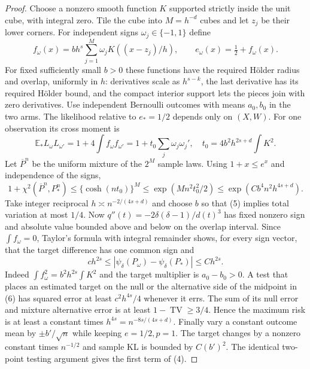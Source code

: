 \documentclass[11pt]{article}
\theoremstyle{definition}
\begin{document}
\begin{proof}
Choose a nonzero smooth function $K$ supported strictly inside the unit
cube, with integral zero. Tile the cube into $M=h^{-d}$ cubes and let
$z_j$ be their lower corners. For independent signs
$\omega_j\in\{-1,1\}$ define
\[
 f_\omega(x)=b h^s\sum_{j=1}^M\omega_jK((x-z_j)/h),\qquad
 e_\omega(x)=\tfrac12+f_\omega(x).
\]
For fixed sufficiently small $b>0$ these functions have the required
H\"older radius and overlap, uniformly in $h$: derivatives scale as
$h^{s-k}$, the last derivative has its required H\"older bound, and the
compact interior support lets the pieces join with zero derivatives.
Use independent Bernoulli outcomes with means $a_0,b_0$ in the two arms.
The likelihood relative to $e_*=1/2$ depends only on $(X,W)$.
For one observation its cross moment is
\[
 \mathbb E_*L_\omega L_{\omega'}
 =1+4\int f_\omega f_{\omega'}
 =1+t_0\sum_j\omega_j\omega_j',\quad
 t_0=4b^2h^{2s+d}\int K^2.
\]
Let $\overline P^n$ be the uniform mixture of the $2^M$ sample laws.
Using $1+x\le e^x$ and independence of the signs,
\[
 1+\chi^2(\overline P^n,P_*^n)
 \le\{\cosh(nt_0)\}^M
 \le\exp(Mn^2t_0^2/2)
 \le\exp(Cb^4n^2h^{4s+d}).                              \tag{5}
\]
Take integer reciprocal $h\asymp n^{-2/(4s+d)}$ and choose $b$ so that
(5) implies total variation at most $1/4$.
Now $q''(t)=-2\delta(\delta-1)/d(t)^3$ has fixed nonzero sign and
absolute value bounded above and below on the overlap interval.
Since $\int f_\omega=0$, Taylor's formula with integral remainder shows,
for every sign vector, that the target difference has one common sign and
\[
 c h^{2s}\le |\psi_\delta(P_\omega)-\psi_\delta(P_*)|
                 \le C h^{2s}.                          \tag{6}
\]
Indeed $\int f_\omega^2=b^2h^{2s}\int K^2$ and the target multiplier is
$a_0-b_0>0$. A test that places an estimated target on the null or the
alternative side of the midpoint in (6) has squared error at least
$c^2h^{4s}/4$ whenever it errs. The sum of its null error and mixture
alternative error is at least $1-\operatorname{TV}\ge3/4$.
Hence the maximum risk is at least a constant times
$h^{4s}=n^{-8s/(4s+d)}$.
Finally vary a constant outcome mean by $\pm b'/\sqrt n$ while keeping
$e=1/2,p=1$. The target changes by a nonzero constant times $n^{-1/2}$
and sample KL is bounded by $C(b')^2$. The identical two-point testing
argument gives the first term of (4).
\end{proof}
\end{document}

